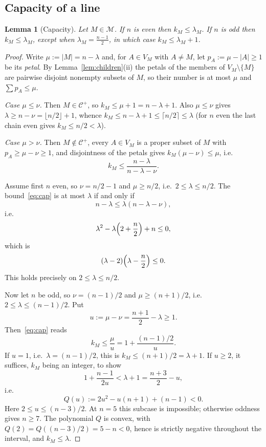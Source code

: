 \documentclass[11pt,a4paper]{amsart}
\theoremstyle{plain}
\newtheorem{lemma}[theorem]{Lemma}
\theoremstyle{definition}
\newcommand{\Cc}{\mathcal{C}}
\newcommand{\Mm}{\mathcal{M}}
\newcommand{\Cp}{\Cc^{+}}
\begin{document}
\subsection*{Capacity of a line}

\begin{lemma}[Capacity]\label{lem:cap}
Let $M\in\Mm$. If $n$ is even then $k_M\le\lambda_M$. If $n$ is odd then
$k_M\le\lambda_M$, except when $\lambda_M=\frac{n-1}{2}$, in which case
$k_M\le\lambda_M+1$.
\end{lemma}

\begin{proof}
Write $\mu:=|M|=n-\lambda$ and, for $A\in V_M$ with $A\ne M$, let
$p_A:=\mu-|A|\ge1$ be its \emph{petal}. By Lemma~\ref{lem:children}(ii) the
petals of the members of $V_M\setminus\{M\}$ are pairwise disjoint nonempty
subsets of $M$, so their number is at most $\mu$ and $\sum p_A\le\mu$.

\emph{Case $\mu\le\nu$.} Then $M\in\Cp$, so $k_M\le\mu+1=n-\lambda+1$. Also
$\mu\le\nu$ gives $\lambda\ge n-\nu=\lfloor n/2\rfloor+1$, whence
$k_M\le n-\lambda+1\le\lceil n/2\rceil\le\lambda$ (for $n$ even the last chain
even gives $k_M\le n/2<\lambda$).

\emph{Case $\mu>\nu$.} Then $M\notin\Cp$, every $A\in V_M$ is a proper subset
of $M$ with $p_A\ge\mu-\nu\ge1$, and disjointness of the petals gives
$k_M(\mu-\nu)\le\mu$, i.e.
\begin{equation}\label{eq:cap}
  k_M\le\frac{n-\lambda}{n-\lambda-\nu}.
\end{equation}

Assume first $n$ even, so $\nu=n/2-1$ and $\mu\ge n/2$, i.e.\
$2\le\lambda\le n/2$. The bound~\eqref{eq:cap} is at most $\lambda$ if and only
if
\[
  n-\lambda\le\lambda(n-\lambda-\nu),
\]
i.e.
\[
  \lambda^2-\lambda\Bigl(2+\frac n2\Bigr)+n\le0,
\]
which is
\[
  (\lambda-2)\Bigl(\lambda-\frac n2\Bigr)\le0.
\]
This holds precisely on $2\le\lambda\le n/2$.

Now let $n$ be odd, so $\nu=(n-1)/2$ and $\mu\ge(n+1)/2$, i.e.\
$2\le\lambda\le(n-1)/2$. Put
\[
  u:=\mu-\nu=\frac{n+1}{2}-\lambda\ge1.
\]
Then~\eqref{eq:cap} reads
\[
  k_M\le\frac{\mu}{u}=1+\frac{(n-1)/2}{u}.
\]
If $u=1$, i.e.\ $\lambda=(n-1)/2$, this is
$k_M\le(n+1)/2=\lambda+1$. If $u\ge2$, it suffices, $k_M$ being an integer, to
show
\[
  1+\frac{n-1}{2u}<\lambda+1=\frac{n+3}{2}-u,
\]
i.e.
\[
  Q(u):=2u^2-u(n+1)+(n-1)<0.
\]
Here $2\le u\le(n-3)/2$. At $n=5$ this subcase is impossible; otherwise
oddness gives $n\ge7$. The polynomial $Q$ is convex, with
$Q(2)=Q((n-3)/2)=5-n<0$, hence is strictly negative throughout the
interval, and $k_M\le\lambda$.
\end{proof}
\end{document}
